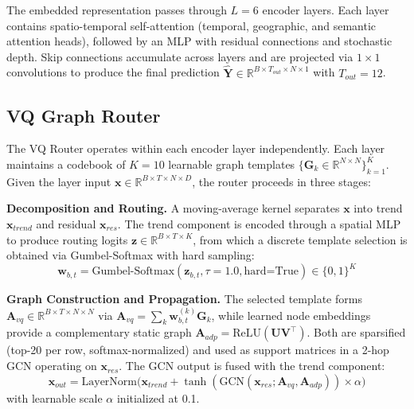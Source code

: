 \documentclass[journal]{IEEEtran}
\begin{document}
The embedded representation passes through $L=6$ encoder layers. Each layer contains spatio-temporal self-attention (temporal, geographic, and semantic attention heads), followed by an MLP with residual connections and stochastic depth. Skip connections accumulate across layers and are projected via $1\times1$ convolutions to produce the final prediction $\hat{\mathbf{Y}} \in \mathbb{R}^{B \times T_{out} \times N \times 1}$ with $T_{out}=12$.

\subsection{VQ Graph Router}

The VQ Router operates within each encoder layer independently. Each layer maintains a codebook of $K=10$ learnable graph templates $\{\mathbf{G}_k \in \mathbb{R}^{N \times N}\}_{k=1}^{K}$. Given the layer input $\mathbf{x} \in \mathbb{R}^{B \times T \times N \times D}$, the router proceeds in three stages:

\noindent\textbf{Decomposition and Routing.} A moving-average kernel separates $\mathbf{x}$ into trend $\mathbf{x}_{trend}$ and residual $\mathbf{x}_{res}$. The trend component is encoded through a spatial MLP to produce routing logits $\mathbf{z} \in \mathbb{R}^{B \times T \times K}$, from which a discrete template selection is obtained via Gumbel-Softmax with hard sampling:
\begin{equation}
\mathbf{w}_{b,t} = \text{Gumbel-Softmax}(\mathbf{z}_{b,t}, \tau=1.0, \text{hard=True}) \in \{0,1\}^{K}
\label{eq:gumbel}
\end{equation}

\noindent\textbf{Graph Construction and Propagation.} The selected template forms $\mathbf{A}_{vq} \in \mathbb{R}^{B \times T \times N \times N}$ via $\mathbf{A}_{vq} = \sum_k \mathbf{w}_{b,t}^{(k)} \mathbf{G}_k$, while learned node embeddings provide a complementary static graph $\mathbf{A}_{adp} = \text{ReLU}(\mathbf{U}\mathbf{V}^\top)$. Both are sparsified (top-20 per row, softmax-normalized) and used as support matrices in a 2-hop GCN operating on $\mathbf{x}_{res}$. The GCN output is fused with the trend component:
\begin{equation}
\mathbf{x}_{out} = \text{LayerNorm}\big(\mathbf{x}_{trend} + \tanh(\text{GCN}(\mathbf{x}_{res}; \mathbf{A}_{vq}, \mathbf{A}_{adp})) \times \alpha\big)
\label{eq:fusion}
\end{equation}
with learnable scale $\alpha$ initialized at 0.1.
\end{document}
